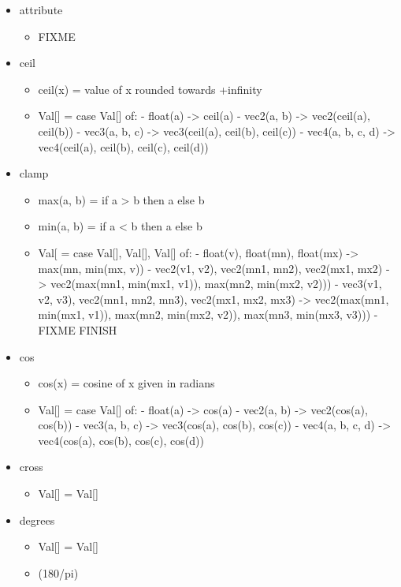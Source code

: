 \documentclass{article}
\begin{document}
\begin{itemize}
\begin{itemize}
\end{itemize}\item attribute \begin{itemize}
\item FIXME

\end{itemize}\item ceil \begin{itemize}
\item ceil(x) = value of x rounded towards +infinity
\item Val[] = case Val[] of:
    - float(a) -> ceil(a)
    - vec2(a, b) -> vec2(ceil(a), ceil(b))
    - vec3(a, b, c) -> vec3(ceil(a), ceil(b), ceil(c))
    - vec4(a, b, c, d) -> vec4(ceil(a), ceil(b), ceil(c), ceil(d))

\end{itemize}\item clamp \begin{itemize}
\item max(a, b) = if a > b then a else b
\item min(a, b) = if a < b then a else b
\item Val[ = case Val[], Val[], Val[] of:
    - float(v), float(mn), float(mx) -> max(mn, min(mx, v))
    - vec2(v1, v2), vec2(mn1, mn2), vec2(mx1, mx2) -> vec2(max(mn1, min(mx1, v1)), max(mn2, min(mx2, v2)))
    - vec3(v1, v2, v3), vec2(mn1, mn2, mn3), vec2(mx1, mx2, mx3) -> vec2(max(mn1, min(mx1, v1)), max(mn2, min(mx2, v2)), max(mn3, min(mx3, v3)))
    - FIXME FINISH
    
\end{itemize}\item cos \begin{itemize}
\item cos(x) = cosine of x given in radians
\item Val[] = case Val[] of:
    - float(a) -> cos(a)
    - vec2(a, b) -> vec2(cos(a), cos(b))
    - vec3(a, b, c) -> vec3(cos(a), cos(b), cos(c))
    - vec4(a, b, c, d) -> vec4(cos(a), cos(b), cos(c), cos(d))

\end{itemize}\item cross \begin{itemize}
\item Val[] = Val[]
\end{itemize}\item degrees \begin{itemize}
\item Val[] = Val[] \item (180/pi)


\end{itemize}
\end{itemize}
\end{document}

